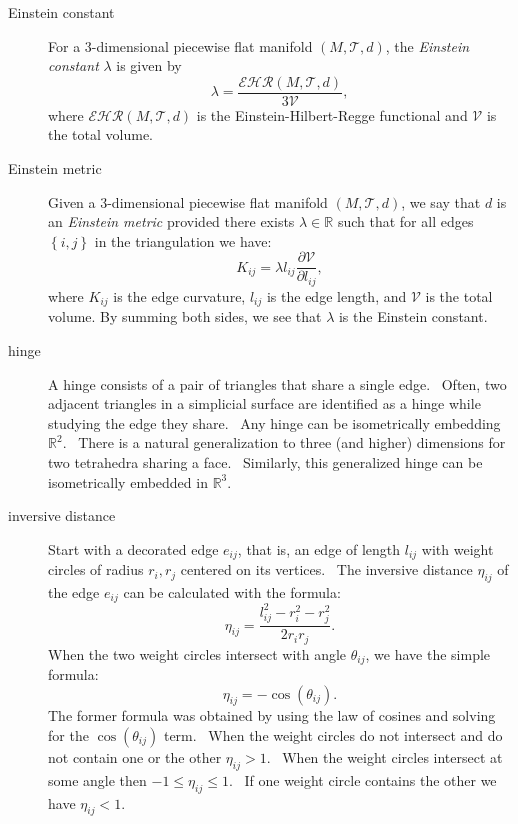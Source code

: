 \begin{description}
\item[Einstein constant] For a 3-dimensional piecewise flat manifold $\left(
M,\mathcal{T},d\right) $, the \textit{Einstein constant} $\lambda $ is given
by%
\[
\lambda =\frac{\mathcal{EHR}\left( M,\mathcal{T},d\right) }{3\mathcal{V}}, 
\]%
where $\mathcal{EHR}\left( M,\mathcal{T},d\right) $ is the
Einstein-Hilbert-Regge functional and $\mathcal{V}$ is the total volume.

\item[Einstein metric] Given a 3-dimensional piecewise flat manifold $\left(
M,\mathcal{T},d\right) $, we say that $d$ is an \textit{Einstein metric}
provided there exists $\lambda \in \mathbb{R}$ such that for all edges $%
\left\{ i,j\right\} $ in the triangulation we have:%
\[
K_{ij}=\lambda l_{ij}\frac{\partial \mathcal{V}}{\partial l_{ij}}, 
\]%
where $K_{ij}$ is the edge curvature, $l_{ij}$ is the edge length, and $%
\mathcal{V}$ is the total volume. By summing both sides, we see that $%
\lambda $ is the Einstein constant.

\item[hinge] A hinge consists of a pair of triangles that share a single
edge. \ Often, two adjacent triangles in a simplicial surface are identified
as a hinge while studying the edge they share. \ Any hinge can be
isometrically embedding $%
\mathbb{R}
^{2}$. \ There is a natural generalization to three (and higher) dimensions
for two tetrahedra sharing a face. \ Similarly, this generalized hinge can
be isometrically embedded in $%
\mathbb{R}
^{3}$. \ 

\item[inversive distance] Start with a decorated edge $e_{ij}$, that is, an
edge of length $l_{ij}$ with weight circles of radius $r_{i},r_{j}$ centered
on its vertices. \ The inversive distance $\eta _{ij}$ of the edge $e_{ij}$
can be calculated with the formula:%
\[
\eta _{ij}=\frac{l_{ij}^{2}-r_{i}^{2}-r_{j}^{2}}{2r_{i}r_{j}}. 
\]%
When the two weight circles intersect with angle $\theta _{ij}$, we have the
simple formula:%
\[
\eta _{ij}=-\cos \left( \theta _{ij}\right) . 
\]%
The former formula was obtained by using the law of cosines and solving for
the $\cos \left( \theta _{ij}\right) $ term. \ When the weight circles do
not intersect and do not contain one or the other $\eta _{ij}>1$. \ When the
weight circles intersect at some angle then $-1\leq \eta _{ij}\leq 1$. \ If
one weight circle contains the other we have $\eta _{ij}<1$. \ 


\end{description}
